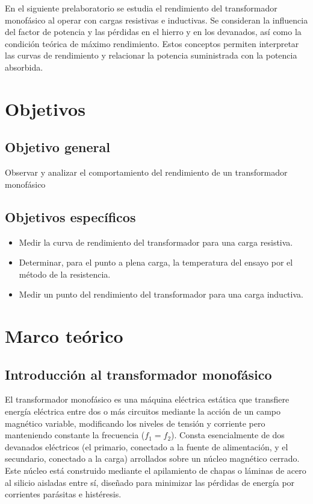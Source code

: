 \documentclass[12pt]{article}
\begin{document}
En el siguiente prelaboratorio se estudia el rendimiento del transformador monof\'asico al operar con cargas resistivas e inductivas. Se consideran la influencia del factor de potencia y las p\'erdidas en el hierro y en los devanados, as\'i como la condici\'on te\'orica de m\'aximo rendimiento. Estos conceptos permiten interpretar las curvas de rendimiento y relacionar la potencia suministrada con la potencia absorbida.

\newpage

\section{Objetivos}

\subsection*{Objetivo general}
Observar y analizar el comportamiento del rendimiento de un transformador monofásico

\subsection*{Objetivos espec\'ificos}
\begin{itemize}
    \item Medir la curva de rendimiento del transformador para una carga resistiva.
    \item Determinar, para el punto a plena carga, la temperatura del ensayo por el método de la resistencia.
    \item Medir un punto del rendimiento del transformador para una carga inductiva.
\end{itemize}
\newpage

\section{Marco te\'orico}
\subsection{Introducci\'on al transformador monof\'asico}

El transformador monof\'asico es una m\'aquina el\'ectrica est\'atica que transfiere energ\'ia el\'ectrica entre dos o m\'as circuitos mediante la acci\'on de un campo magn\'etico variable, modificando los niveles de tensi\'on y corriente pero manteniendo constante la frecuencia ($f_1 = f_2$). Consta esencialmente de dos devanados el\'ectricos (el primario, conectado a la fuente de alimentaci\'on, y el secundario, conectado a la carga) arrollados sobre un n\'ucleo magn\'etico cerrado. Este n\'ucleo est\'a construido mediante el apilamiento de chapas o l\'aminas de acero al silicio aisladas entre s\'i, dise\~nado para minimizar las p\'erdidas de energ\'ia por corrientes par\'asitas e hist\'eresis.
\end{document}
